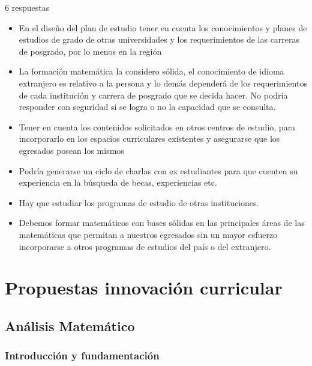 \documentclass[a4paper,10pt,BCOR10mm,oneside,headsepline]{scrbook}
\begin{document}
\begin{subappendices}
   6 respuestas

   \begin{itemize}
    \item   En el diseño del plan de estudio tener en cuenta los conocimientos y planes de estudios de grado de otras universidades  y los requerimientos de las carreras de posgrado, por lo menos en la región
    \item La formación matemática la considero sólida, el conocimiento de idioma extranjero es relativo a la persona y lo demás dependerá de los requerimientos de cada institución y carrera de posgrado que se decida hacer. No podría responder con seguridad si se logra o no la capacidad que se consulta.
    \item Tener en cuenta los contenidos solicitados en otros centros de estudio, para incorporarlo en los espacios curriculares existentes y asegurarse que los egresados posean los mismos
    \item Podría generarse un ciclo de charlas con ex estudiantes para que cuenten su experiencia en la búsqueda de becas, experiencias etc. 
    \item Hay que estudiar los programas de estudio de otras instituciones.  
    \item  Debemos formar matemáticos con bases sólidas en las principales áreas de las matemáticas que permitan a nuestros egresados sin un mayor esfuerzo incorporarse a otros programas de estudios del país o del extranjero. 

   \end{itemize}

 









 \end{subappendices}
 
 
\chapter{Propuestas innovación curricular}

\section{Análisis Matemático}

\subsection{Introducción y fundamentación}
\end{document}
